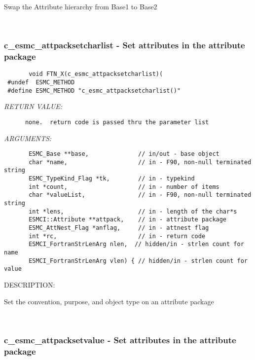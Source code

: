       Swap the Attribute hierarchy from Base1 to Base2
   
 
\mbox{}\hrulefill\ 
 
\subsubsection [c\_esmc\_attpacksetcharlist] {c\_esmc\_attpacksetcharlist - Set attributes in the attribute package}


  
\begin{verbatim}       void FTN_X(c_esmc_attpacksetcharlist)(
 #undef  ESMC_METHOD
 #define ESMC_METHOD "c_esmc_attpacksetcharlist()"\end{verbatim}{\em RETURN VALUE:}
\begin{verbatim}      none.  return code is passed thru the parameter list
   \end{verbatim}{\em ARGUMENTS:}
\begin{verbatim}       ESMC_Base **base,              // in/out - base object
       char *name,                    // in - F90, non-null terminated string
       ESMC_TypeKind_Flag *tk,        // in - typekind
       int *count,                    // in - number of items
       char *valueList,               // in - F90, non-null terminated string
       int *lens,                     // in - length of the char*s
       ESMCI::Attribute **attpack,    // in - attribute package
       ESMC_AttNest_Flag *anflag,     // in - attnest flag
       int *rc,                       // in - return code
       ESMCI_FortranStrLenArg nlen,  // hidden/in - strlen count for name
       ESMCI_FortranStrLenArg vlen) { // hidden/in - strlen count for value
   \end{verbatim}
{\sf DESCRIPTION:\\ }


       Set the convention, purpose, and object type on an attribute package
   
 
\mbox{}\hrulefill\ 
 
\subsubsection [c\_esmc\_attpacksetvalue] {c\_esmc\_attpacksetvalue - Set attributes in the attribute package}


